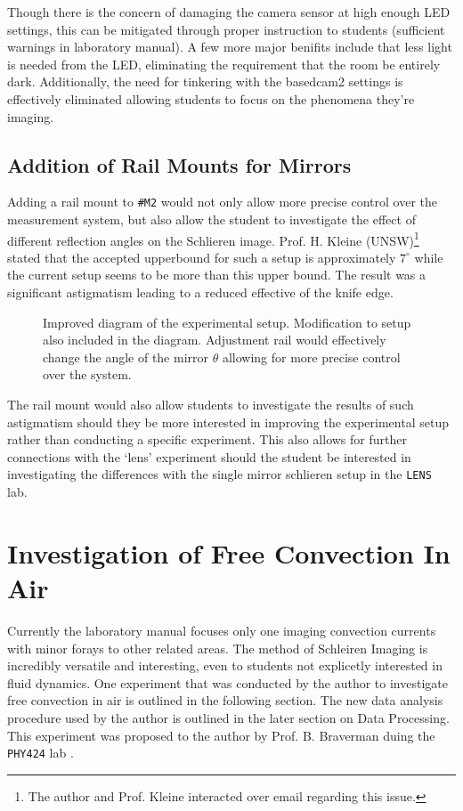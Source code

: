 \documentclass[aip, cp, amsmath, amssymb, reprint, nofootinbib]{revtex4-2}
\begin{document}
        Though there is the concern of damaging the camera sensor at high enough LED settings, this can be mitigated through proper instruction to students (sufficient warnings in laboratory manual). A few more major benifits include that less light is needed from the LED, eliminating the requirement that the room be entirely dark. Additionally, the need for tinkering with the basedcam2 settings is effectively eliminated allowing students to focus on the phenomena they're imaging.

        \subsection{Addition of Rail Mounts for Mirrors}
        Adding a rail mount to \texttt{\#M2} would not only allow more precise control over the measurement system, but also allow the student to investigate the effect of different reflection angles on the Schlieren image. Prof. H. Kleine (UNSW)\footnote{The author and Prof. Kleine interacted over email regarding this issue.}\cite{kleine} stated that the accepted upperbound for such a setup is approximately $7^{\circ}$ while the current setup seems to be more than this upper bound. The result was a significant astigmatism leading to a reduced effective of the knife edge. 

        \begin{figure}[H]
            \centering
            \scalebox{0.9}{}
            \caption{Improved diagram of the experimental setup. Modification to setup also included in the diagram. Adjustment rail would effectively change the angle of the mirror $\theta$ allowing for more precise control over the system.}
        \end{figure}

        The rail mount would also allow students to investigate the results of such astigmatism should they be more interested in improving the experimental setup rather than conducting a specific experiment. This also allows for further connections with the `lens' experiment should the student be interested in investigating the differences with the single mirror schlieren setup in the \texttt{LENS} lab.

    \section{Investigation of Free Convection In Air}
        Currently the laboratory manual focuses only one imaging convection currents with minor forays to other related areas. The method of Schleiren Imaging is incredibly versatile and interesting, even to students not explicetly interested in fluid dynamics. One experiment that was conducted by the author to investigate free convection in air \cite{adi} is outlined in the following section. The new data analysis procedure used by the author is outlined in the later section on Data Processing. This experiment was proposed to the author by Prof. B. Braverman duing the \texttt{PHY424} lab \cite{pbrave}.
\end{document}
